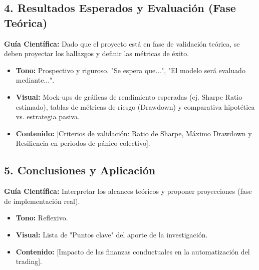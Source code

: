 \documentclass[12pt, a4paper]{article}
\begin{document}
\subsection{4. Resultados Esperados y Evaluación (Fase Teórica)}
\textbf{Guía Científica:} Dado que el proyecto está en fase de validación teórica, se deben proyectar los hallazgos y definir las métricas de éxito.
\begin{itemize}
    \item \textbf{Tono:} Prospectivo y riguroso. "Se espera que...", "El modelo será evaluado mediante...".
    \item \textbf{Visual:} Mock-ups de gráficas de rendimiento esperadas (ej. Sharpe Ratio estimado), tablas de métricas de riesgo (Drawdown) y comparativa hipotética vs. estrategia pasiva.
    \item \textbf{Contenido:} [Criterios de validación: Ratio de Sharpe, Máximo Drawdown y Resiliencia en periodos de pánico colectivo].
\end{itemize}

\subsection{5. Conclusiones y Aplicación}
\textbf{Guía Científica:} Interpretar los alcances teóricos y proponer proyecciones (fase de implementación real).
\begin{itemize}
    \item \textbf{Tono:} Reflexivo.
    \item \textbf{Visual:} Lista de "Puntos clave" del aporte de la investigación.
    \item \textbf{Contenido:} [Impacto de las finanzas conductuales en la automatización del trading].
\end{itemize}
\end{document}
